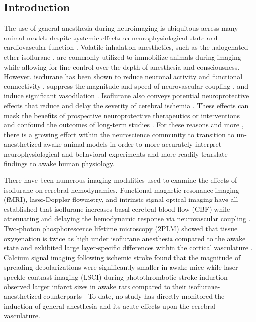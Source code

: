 \documentclass[12pt]{spieman}
\begin{document}
\begin{spacing}{2}   %


\section{Introduction}
\label{sect:introduction}

The use of general anesthesia during neuroimaging is ubiquitous across many animal models despite systemic effects on neurophysiological state and cardiovascular function \cite{Slupe:2018ea}. Volatile inhalation anesthetics, such as the halogenated ether isoflurane \cite{Eger:1981ia}, are commonly utilized to immobilize animals during imaging while allowing for fine control over the depth of anesthesia and consciousness. However, isoflurane has been shown to reduce neuronal activity \cite{Aksenov:2015ea} and functional connectivity \cite{Xie:2019de}, suppress the magnitude and speed of neurovascular coupling \cite{Masamoto:2012bj,Takuwa:2012ee,Pisauro:2013cx}, and induce significant vasodilation \cite{Koenig:1994rn,Strebel:1995uh,Iida:1998th}. Isoflurane also conveys potential neuroprotective effects that reduce and delay the severity of cerebral ischemia \cite{Kitano:2007ia,Kawaguchi:2000id,Sakai:2007wc,Li:2013ip,Lu:2017bo}. These effects can mask the benefits of prospective neuroprotective therapeutics or interventions and confound the outcomes of long-term studies \cite{Kapinya:2002ua,Seto:2014ga}. For these reasons and more \cite{Gao:2017tw}, there is a growing effort within the neuroscience community to transition to un-anesthetized awake animal models in order to more accurately interpret neurophysiological and behavioral experiments and more readily translate findings to awake human physiology.

There have been numerous imaging modalities used to examine the effects of isoflurane on cerebral hemodynamics. Functional magnetic resonance imaging (fMRI), laser-Doppler flowmetry, and intrinsic signal optical imaging have all established that isoflurane increases basal cerebral blood flow (CBF) while attenuating and delaying the hemodynamic response via neurovascular coupling \cite{Sicard:2003dj,Desai:2011mb,Aksenov:2015ea,Takuwa:2012ee,Pisauro:2013cx}. Two-photon phosphorescence lifetime microscopy (2PLM) showed that tissue oxygenation is twice as high under isoflurane anesthesia compared to the awake state and exhibited large layer-specific differences within the cortical vasculature \cite{Lyons:2016bd}. Calcium signal imaging following ischemic stroke found that the magnitude of spreading depolarizations were significantly smaller in awake mice \cite{Balbi:2017cj} while laser speckle contrast imaging (LSCI) during photothrombotic stroke induction observed larger infarct sizes in awake rats compared to their isoflurane-anesthetized counterparts \cite{Lu:2017bo}. To date, no study has directly monitored the induction of general anesthesia and its acute effects upon the cerebral vasculature.


\end{spacing}
\end{document}

